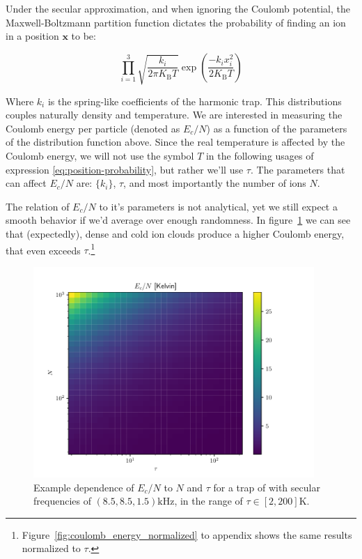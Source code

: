 Under the secular approximation, and when ignoring the Coulomb potential, the Maxwell-Boltzmann partition function dictates the probability of finding an ion in a position $\mathbf{x}$ to be:

\begin{equation}
	\prod_{i=1}^3 \sqrt{\frac{k_i}{2\pi K_\text{B} T}} \exp\left(\frac{-k_i x_i^2}{2 K_\text{B} T}\right)
	\label{eq:position-probability}
\end{equation}

Where $k_i$ is the spring-like coefficients of the harmonic trap. This distributions couples naturally density and temperature. We are interested in measuring the Coulomb energy per particle (denoted as $E_c/N$) as a function of the parameters of the distribution function above. Since the real temperature is affected by the Coulomb energy, we will not use the symbol $T$ in the following usages of expression \ref{eq:position-probability}, but rather we'll use $\tau$. The parameters that can affect $E_c/N$ are: $\{k_i\}$, $\tau$, and most importantly the number of ions $N$.

The relation of $E_c/N$ to it's parameters is not analytical, yet we still expect a smooth behavior if we'd average over enough randomness. In figure~\ref{fig:coulomb_energy} we can see that (expectedly), dense and cold ion clouds produce a higher Coulomb energy, that even exceeds $\tau$.\footnote{Figure~\ref{fig:coulomb_energy_normalized} to appendix shows the same results normalized to $\tau$.}

\begin{figure}
	\begin{center}
		\includegraphics[width=0.95\textwidth]{graphics/coulomb_energy_example@coulomb_energy.pdf}
	\end{center}
	\caption{Example dependence of $E_c/N$ to $N$ and $\tau$ for a trap of  with secular frequencies of $(8.5, 8.5, 1.5) \mathrm{kHz}$, in the range of $\tau\in[2, 200]\mathrm{K}$.}\label{fig:coulomb_energy}
\end{figure}

